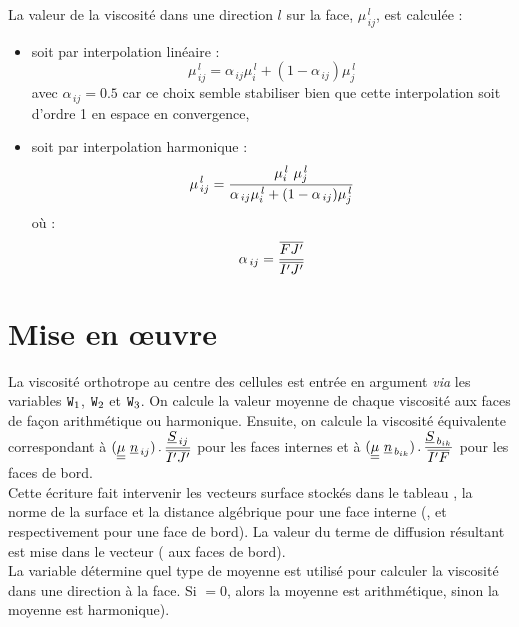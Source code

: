 La valeur de la viscosité dans une direction $l$ sur la face, $\mu_{\,ij}^{\,l}$,
est calculée :
\begin{itemize}
\item soit par interpolation lin\'eaire :
\begin{equation}
\mu_{\,ij}^{\,l}=\alpha_{\,ij}\mu_{i}^{\,l}+(1-\alpha_{\,ij})\mu_{j}^{\,l}
\end{equation}
avec $\alpha_{\,ij}= 0.5$ car ce choix semble stabiliser bien que cette
interpolation soit d'ordre 1 en espace en convergence,
\item soit par interpolation harmonique :
\begin{equation}\notag
\mu_{\,ij}^{\,l}=\displaystyle
\frac{\mu_{i}^{\,l}\ \mu_{j}^{\,l}}{\alpha_{\,ij}\mu_{i}^{\,l}+(1-\alpha_{\,ij}) \mu_{j}^{\,l}}
\end{equation}
où :
\begin{equation}\notag
\displaystyle \alpha_{\,ij}=\frac{\overline{FJ'}}{\overline{I'J'}}
\end{equation}
\end{itemize}

\section*{Mise en \oe uvre}
La viscosité orthotrope au centre des cellules est entrée en argument {\it via}
les variables $\text{\texttt{W}}_1$, $\text{\texttt{W}}_2$ et $\text{\texttt{W}}_3$. On calcule la valeur
moyenne de chaque viscosité aux faces de façon arithmétique ou
harmonique. Ensuite, on calcule la viscosité équivalente correspondant à
$\displaystyle (\tens{\mu}\ \underline{n}_{\,ij})\,.\,\frac{\underline{S}_{\,ij}}{\overline{I'J'}}$ pour les
faces internes et à $\displaystyle (\underline{\underline{\mu}}\ \underline{n}_{\,b_{ik}})\,.\,
\frac{\underline{S}_{\,b_{ik}}}{\overline{I'F}}$ pour les faces de bord.\\

Cette \'ecriture fait intervenir les vecteurs surface stock\'es dans le tableau
, la norme de la surface 
 et la distance alg\'ebrique  pour une face interne (,
 et  respectivement pour une face de bord). La valeur du
terme de diffusion résultant est mise dans le vecteur  ( aux faces de bord).\\
La variable  détermine quel type de moyenne est utilisé pour
calculer la viscosité dans une direction \`a la face. Si $=0$, alors
la moyenne est arithmétique, sinon la moyenne est harmonique).
